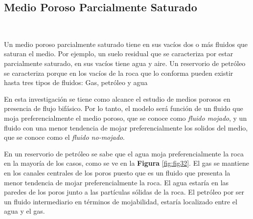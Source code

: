 
\bigskip




\subsection{Medio Poroso Parcialmente Saturado}~\hypertarget{sec:sec322}{}
\label{sec:sec322}

Un medio poroso parcialmente saturado tiene en sus vacíos dos o más fluidos que saturan el medio. Por ejemplo, un suelo residual que se caracteriza por estar parcialmente saturado, en sus vacíos tiene agua y aire. Un reservorio de petróleo se caracteriza porque en los vacíos de la roca que lo conforma pueden existir hasta tres tipos de fluidos: Gas, petróleo y agua\bigskip

En esta investigación se tiene como alcance el estudio de medios porosos en presencia de flujo bifásico. Por lo tanto, el modelo será función de un fluido que moja preferencialmente el medio poroso, que se conoce como \textit{fluido mojado}, y un fluido con una menor tendencia de mojar preferencialmente los solidos del medio, que se conoce como el \textit{fluido no-mojado}.\bigskip

En un reservorio de petróleo se sabe que el agua moja preferencialmente la roca en la mayoría de los casos, como se ve en la \textbf{Figura} \ref{fig:fig32}. El gas se mantiene en los canales centrales de los poros puesto que es un fluido que presenta la menor tendencia de mojar preferencialmente la roca. El agua estaría en las paredes de los poros junto a las partículas sólidas de la roca. El petróleo por ser un fluido intermediario en términos de mojabilidad, estaría localizado entre el agua y el gas.\bigskip

